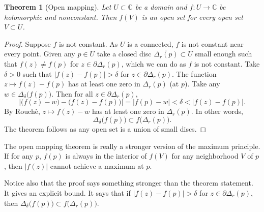 \documentclass[12pt,openany]{book}
\newcommand{\sabs}[1]{\lvert {#1} \rvert}
\newcommand{\abs}[1]{\left\lvert {#1} \right\rvert}
\newcommand{\C}{{\mathbb{C}}}
\theoremstyle{plain}
\newtheorem{thm}{Theorem}[section]
\theoremstyle{remark}
\theoremstyle{definition}
\theoremstyle{exercise}
\theoremstyle{example}
\begin{document}
\begin{thm}[Open mapping]\label{thm:OMT}
Let $U \subset \C$ be a domain and $f \colon U \to \C$ be
holomorphic and nonconstant.  Then $f(V)$ is an open set for every open set
$V \subset U$.
\end{thm}

\begin{proof}
Suppose $f$ is not constant.  As $U$ is a connected, $f$ is not constant
near every point.
Given any $p \in U$ take 
a closed disc $\overline{\Delta_r(p)} \subset U$ small enough such that
$f(z) \not= f(p)$ for $z \in \partial \Delta_r(p)$, which we can do as $f$
is not constant.  Take $\delta > 0$ such
that $\abs{f(z)-f(p)} > \delta$ for $z \in \partial \Delta_r(p)$.
The function $z \mapsto f(z)-f(p)$ has at least one zero in $\Delta_r(p)$
(at $p$).  Take any $w \in \Delta_{\delta}\bigl(f(p)\bigr)$.  Then for
all $z \in \partial \Delta_r(p)$,
\begin{equation*}
\abs{\bigl( f(z)-w \bigr) - \bigl( f(z)-f(p) \bigr)} = \abs{f(p)-w} <
\delta < \abs{f(z)-f(p)} .
\end{equation*}
By Rouch\`e, $z \mapsto f(z)-w$ has at least one zero in $\Delta_r(p)$.
In other words,
\begin{equation*}
\Delta_{\delta}\bigl(f(p)\bigr) \subset
f\bigl(\Delta_r(p)\bigr) .
\end{equation*}
The theorem follows as any open set is a union of small discs.
\end{proof}

The open mapping theorem is really a stronger version of the maximum
principle.
If for any $p$,
$f(p)$ is always in the interior of $f(V)$ for any neighborhood $V$ of
$p$, then $\sabs{f(z)}$ cannot achieve a maximum at $p$.

Notice also that the proof says something stronger than the theorem statement.  It
gives an explicit bound.  It says that if 
$\abs{f(z)-f(p)} > \delta$ for $z \in \partial \Delta_r(p)$,
then
$\Delta_{\delta}\bigl(f(p)\bigr) \subset f\bigl(\Delta_r(p)\bigr)$.
\end{document}
